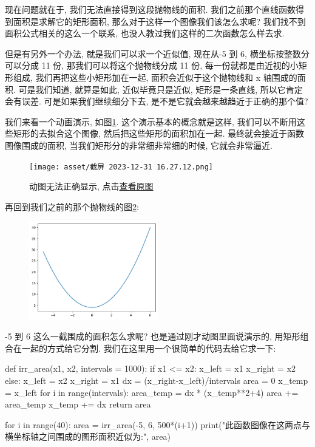 现在问题就在于, 我们无法直接得到这段抛物线的面积. 我们之前那个直线函数得到面积是求解它的矩形面积, 那么对于这样一个图像我们该怎么求呢? 我们找不到面积公式相关的这么一个联系, 也没人教过我们这样的二次函数怎么样去求. 

但是有另外一个办法, 就是我们可以求一个近似值, 现在从-5 到 6,  横坐标按整数分可以分成 11 份, 那我们可以将这个抛物线分成 11 份, 每一份就都是由近视的小矩形组成, 我们再把这些小矩形加在一起, 面积会近似于这个抛物线和 x 轴围成的面积. 可是我们知道, 就算是如此, 近似毕竟只是近似, 矩形是一条直线, 所以它肯定会有误差. 可是如果我们继续细分下去, 是不是它就会越来越趋近于正确的那个值? 

我们来看一个动画演示, 如图\ref{fig:img13_10}. 这个演示基本的概念就是这样, 我们可以不断用这些矩形的去拟合这个图像, 然后把这些矩形的面积加在一起. 最终就会接近于函数图像围成的面积, 当我们矩形分的非常细非常细的时候, 它就会非常逼近. 

\begin{figure}[ht]
  \centering
  \texttt{[image: asset/截屏 2023-12-31 16.27.12.png]}
  \caption{动图无法正确显示, 点击\href{https://raw.githubusercontent.com/hivandu/notes/main/img/20230903155234.gif}{查看原图}}
  \label{fig:img13_10}
\end{figure}



再回到我们之前的那个抛物线的图\ref{fig:img13_11}:

\begin{figure}[ht]
  \centering
  \caption{}
  \label{fig:img13_11}
  \includegraphics[width=0.5\textwidth]{asset/20230903151121.png}
\end{figure}

-5 到 6 这么一截围成的面积怎么求呢? 也是通过刚才动图里面说演示的, 用矩形组合在一起的方式给它分割. 我们在这里用一个很简单的代码去给它求一下:

\begin{python}
def irr_area(x1, x2, intervals = 1000):
    if x1 <= x2:
        x_left = x1
        x_right = x2
    else:
        x_left = x2
        x_right = x1
    dx = (x_right-x_left)/intervals
    area = 0
    x_temp = x_left
    for i in range(intervals):
        area_temp = dx * (x_temp**2+4)
        area += area_temp
        x_temp += dx
    return area
  
 for i in range(40):
    area = irr_area(-5, 6, 500*(i+1))
    print("此函数图像在这两点与横坐标轴之间围成的图形面积近似为:", area)
\end{python}

